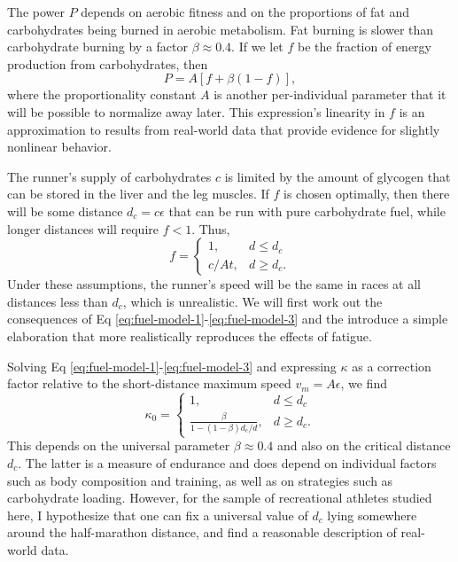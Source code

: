 \documentclass[10pt,letterpaper]{article}
\begin{document}
The power $P$ depends on aerobic fitness and on the proportions of fat and carbohydrates being
burned in aerobic metabolism. Fat burning is slower than carbohydrate burning by a factor $\beta\approx 0.4$.\cite{rapoport}
If we let $f$ be the fraction of energy production from carbohydrates, then
\begin{equation}\label{eq:fuel-model-2}
  P = A[f+\beta(1-f)],
\end{equation}
where the proportionality constant $A$ is another per-individual parameter that it will be
possible to normalize away later. This expression's linearity in $f$ is an approximation to
results from real-world data that provide evidence for slightly nonlinear behavior.\cite{rapoport}

The runner's supply of carbohydrates $c$ is limited by the amount of glycogen that can be stored
in the liver and the leg muscles. If $f$ is chosen optimally, then there will be some distance
$d_c=c\epsilon$ that can be run with pure carbohydrate fuel, while longer distances will require $f<1$.
Thus,
\begin{equation}\label{eq:fuel-model-3}
  f = \begin{cases}
    1, & d\le d_c \\
    c/At, & d\ge d_c.
\end{cases}
\end{equation}
Under these assumptions, the runner's speed will be the same in races at all distances less than $d_c$,
which is unrealistic. We will first work out the consequences of Eq \ref{eq:fuel-model-1}-\ref{eq:fuel-model-3}
and the introduce a simple elaboration that more realistically reproduces the effects of fatigue.

Solving Eq \ref{eq:fuel-model-1}-\ref{eq:fuel-model-3} and expressing $\kappa$ as a correction factor
relative to the short-distance maximum speed $v_m=A\epsilon$, we find
\begin{equation}\label{eq:kappa-simple}
  \kappa_0 = \begin{cases}
    1, & d\le d_c \\
    \frac{\beta}{1-(1-\beta)d_c/d}, & d\ge d_c.
  \end{cases}
\end{equation}
This depends on the universal parameter $\beta\approx0.4$ and also on the critical distance $d_c$.
The latter is a measure of endurance and does depend on individual factors such as
body composition and training, as well as on strategies such as carbohydrate loading.
However, for the sample of recreational athletes studied here, I hypothesize that one can fix a universal value of $d_c$ lying somewhere
around the half-marathon distance, and find a reasonable description of
real-world data.
\end{document}
